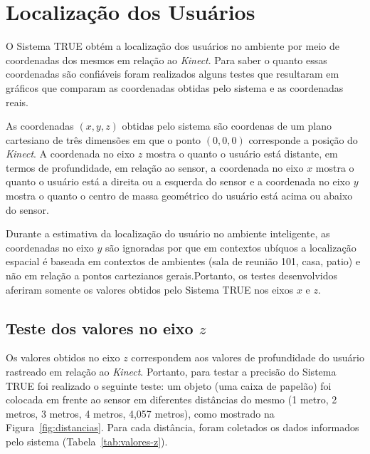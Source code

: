 \section{Localização dos Usuários}

O Sistema TRUE obtém a localização dos usuários no ambiente por meio de coordenadas dos mesmos em relação ao \textit{Kinect}. Para saber o quanto essas coordenadas são confiáveis foram realizados alguns testes que resultaram em gráficos que comparam as coordenadas obtidas pelo sistema e as coordenadas reais.

As coordenadas $\displaystyle (x, y, z)$ obtidas pelo sistema são coordenas de um plano cartesiano de três dimensões em que o ponto $\displaystyle (0, 0, 0)$ corresponde a posição do \textit{Kinect}. A coordenada no eixo  $\displaystyle z$ mostra o quanto o usuário está distante, em termos de profundidade, em relação ao sensor, a coordenada no eixo  $\displaystyle x$ mostra o quanto o usuário está a direita ou a esquerda do sensor e a coordenada no eixo  $\displaystyle y$ mostra o quanto o centro de massa geométrico do usuário está acima ou abaixo do sensor. 

Durante a estimativa da localização do usuário no ambiente inteligente, as coordenadas no eixo  $\displaystyle y$ são ignoradas por que em contextos ubíquos a localização espacial é baseada em contextos de ambientes (sala de reunião 101, casa, patio) e não em relação a pontos cartezianos gerais.Portanto, os testes desenvolvidos aferiram somente os valores obtidos pelo Sistema TRUE nos eixos $\displaystyle x$ e $\displaystyle z$.



\subsection{Teste dos valores no eixo $\displaystyle z$}

	Os valores obtidos no eixo $\displaystyle z$ correspondem aos valores de profundidade do usuário rastreado em relação ao \textit{Kinect}. Portanto, para testar a precisão do Sistema TRUE foi realizado o seguinte teste: um objeto (uma caixa de papelão) foi colocada em frente ao sensor em diferentes distâncias do mesmo (1 metro, 2 metros, 3 metros, 4 metros, 4,057 metros), como mostrado na Figura~\ref{fig:distancias}. Para cada distância, foram coletados os dados informados pelo sistema (Tabela~\ref{tab:valores-z}).

